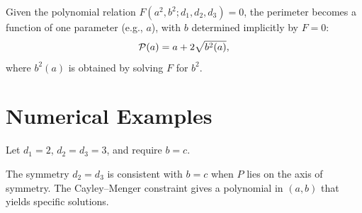 Given the polynomial relation $F(a^2, b^2; d_1, d_2, d_3) = 0$, the perimeter becomes a function of one parameter (e.g., $a$), with $b$ determined implicitly by $F = 0$:
\begin{equation}
\mathcal{P}(a) = a + 2\sqrt{b^2(a)},
\end{equation}
where $b^2(a)$ is obtained by solving $F$ for $b^2$.

\section{Numerical Examples}

\begin{example}
Let $d_1 = 2$, $d_2 = d_3 = 3$, and require $b = c$.

The symmetry $d_2 = d_3$ is consistent with $b = c$ when $P$ lies on the axis of symmetry. The Cayley--Menger constraint gives a polynomial in $(a, b)$ that yields specific solutions.
\end{example}
